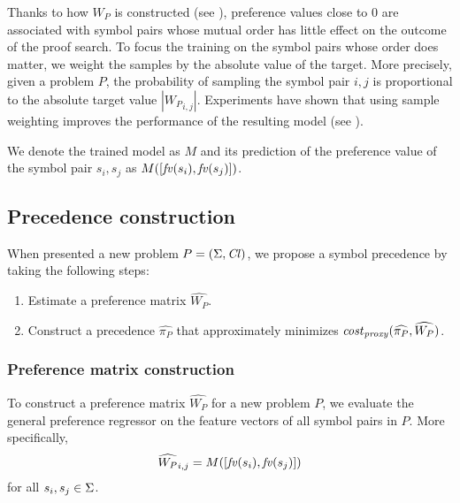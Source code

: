 \documentclass{ceurart}
\begin{document}
Thanks to how \(W_P\) is constructed (see ),
preference values close to 0 are associated with symbol pairs whose mutual order has little effect
on the outcome of the proof search.
To focus the training on the symbol pairs whose order does matter,
we weight the samples by the absolute value of the target.
More precisely, given a problem $P$,
the probability of sampling the symbol pair $i,j$
is proportional to the absolute target value $|{W_P}_{i,j}|$.
%
Experiments have shown that using sample weighting
improves the performance of the resulting model (see ).



\newcommand{\GeneralRegressor}{M}
We denote the trained model as \(\GeneralRegressor\)
and its prediction of the preference value of the symbol pair \(s_i, s_j\)
as \(\GeneralRegressor([\fv(s_i), \fv(s_j)])\).

\subsection{Precedence construction} \label{sect:construction}

When presented a new problem \(P = (\operatorname{\Sigma}, \operatorname{\mathit{Cl}})\), we propose a symbol precedence by taking the following steps:
\begin{enumerate}
	\item Estimate a preference matrix \(\widehat{W_P}\).
	\item Construct a precedence \(\widehat{\pi_P}\) that approximately minimizes
	\(\operatorname{\mathit{\operatorname{\mathit{cost}}_{proxy}}}(\widehat{\pi_P}, \widehat{W_P})\).
\end{enumerate}

\subsubsection{Preference matrix construction}

To construct a preference matrix \(\widehat{W_P}\) for a new problem \(P\),
we evaluate the general preference regressor
on the feature vectors of all symbol pairs in \(P\).
More specifically,
\begin{align*}
\widehat{W_P}_{i, j} = M([\mathit{fv}(s_i), \mathit{fv}(s_j)])
\end{align*}
for all \(s_i, s_j \in \operatorname{\Sigma}\).
\end{document}
